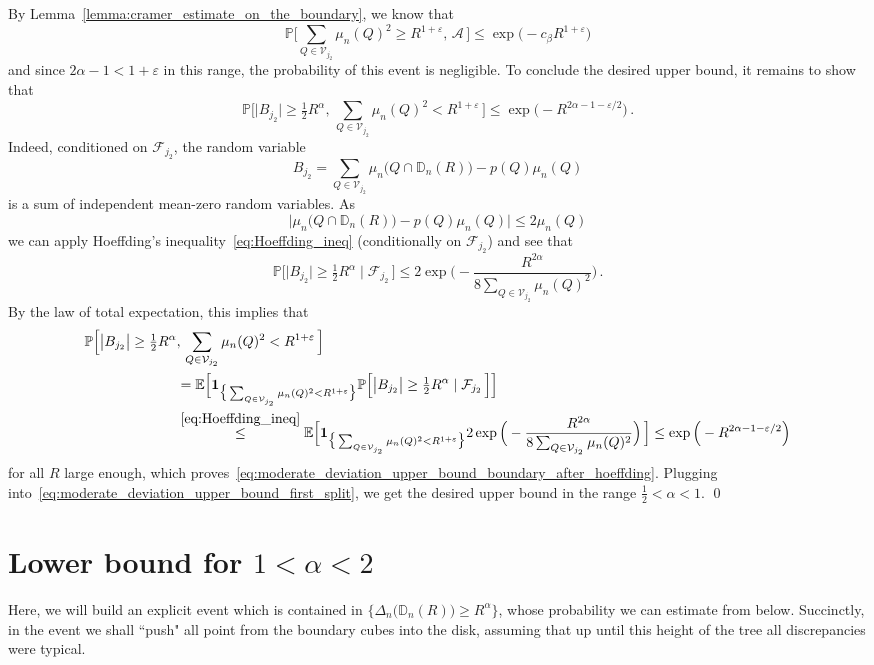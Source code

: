\documentclass[11pt]{amsart}
\theoremstyle{definition}
\theoremstyle{remark}
\numberwithin{equation}{section}
\def\eps{{\varepsilon}}
\newcommand{\bD}{\mathbb D}
\newcommand{\bP}{\mathbb P}
\newcommand{\bE}{\mathbb E}
\begin{document}
	By Lemma~\ref{lemma:cramer_estimate_on_the_boundary}, we know that
	\[
	\bP\Big[\sum_{Q\in \mathcal{V}_{j_2}} \mu_n(Q)^2 \ge R^{1+\eps} , \, \mathcal{A} \, \Big] \le \exp\Big(-c_\beta R^{1+\eps}\Big)
	\]
	and since $2\alpha-1<1+\eps$ in this range, the probability of this event is negligible. To conclude the desired upper bound, it remains to show that
	\begin{equation}
		\label{eq:moderate_deviation_upper_bound_boundary_after_hoeffding}
		\bP\Big[\big|B_{j_2} \big| \ge \tfrac{1}{2}R^{\alpha}, \, \sum_{Q\in \mathcal{V}_{j_2}} \mu_n(Q)^2 < R^{1+\eps} \, \Big] \le \exp\Big(-R^{2\alpha - 1 - \eps/2}\Big) \, .
	\end{equation}
	Indeed, conditioned on $\mathcal{F}_{j_2}$, the random variable
	\[
	B_{j_2} = \sum_{Q\in \mathcal{V}_{j_2}} \mu_n\big(Q\cap \bD_n(R)\big) - p(Q) \mu_n(Q)
	\]
	is a sum of independent mean-zero random variables. As
	\[
	\big|\mu_n\big(Q\cap \bD_n(R)\big) - p(Q) \mu_n(Q)\big| \le 2 \mu_n(Q)
	\]
	we can apply Hoeffding's inequality~\eqref{eq:Hoeffding_ineq} (conditionally on $\mathcal{F}_{j_2}$) and see that
	\begin{equation*}
		\bP\Big[\big|B_{j_2} \big| \ge \tfrac{1}{2}R^{\alpha}\mid \mathcal{F}_{j_2} \, \Big] \le 2\exp\Big(- \frac{R^{2\alpha}}{8\sum_{Q\in \mathcal{V}_{j_2}} \mu_n(Q)^2}\Big) \, .
	\end{equation*}
	By the law of total expectation, this implies that
	\begin{align*}
		\bP\Big[\big|B_{j_2} \big| \ge \tfrac{1}{2}R^{\alpha}&, \, \sum_{Q\in \mathcal{V}_{j_2}} \mu_n(Q)^2 < R^{1+\eps} \, \Big] \\ &= \bE\Big[ \mathbf{1}_{\big\{\sum_{Q\in \mathcal{V}_{j_2}} \mu_n(Q)^2 < R^{1+\eps}\big\}} \bP\Big[\big|B_{j_2} \big| \ge \tfrac{1}{2}R^{\alpha}\mid \mathcal{F}_{j_2} \, \Big]  \Big] \\ & \stackrel{\eqref{eq:Hoeffding_ineq}}{\le} \bE\Big[ \mathbf{1}_{\big\{\sum_{Q\in \mathcal{V}_{j_2}} \mu_n(Q)^2 < R^{1+\eps}\big\}} 2\exp\Big(- \frac{R^{2\alpha}}{8\sum_{Q\in \mathcal{V}_{j_2}} \mu_n(Q)^2}\Big) \, \Big]  \le \exp\Big(-R^{2\alpha - 1 - \eps/2}\Big)
	\end{align*}
	for all $R$ large enough, which proves~\eqref{eq:moderate_deviation_upper_bound_boundary_after_hoeffding}. Plugging into~\eqref{eq:moderate_deviation_upper_bound_first_split}, we get the desired upper bound in the range $\frac{1}{2}<\alpha<1$.
	\qed
	\section{Lower bound for \texorpdfstring{$1 < \alpha < 2$}{1 < alpha < 2}}
	\label{sec:LB_large_deviations}
	Here, we will build an explicit event which is contained in $\{\Delta_n\big(\bD_n(R)\big) \ge R^\alpha\}$, whose probability we can estimate from below. Succinctly, in the event we shall ``push" all point from the boundary cubes into the disk, assuming that up until this height of the tree all discrepancies were typical.
	
\end{document}
